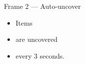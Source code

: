 \documentclass{beamer}
\begin{document}
\begin{frame}{Frame 2 --- Auto-uncover}
\begin{itemize}[<+->]
\item Items 
\item are uncovered
\item every 3 seconds.
\end{itemize}

\end{frame}
\end{document}
